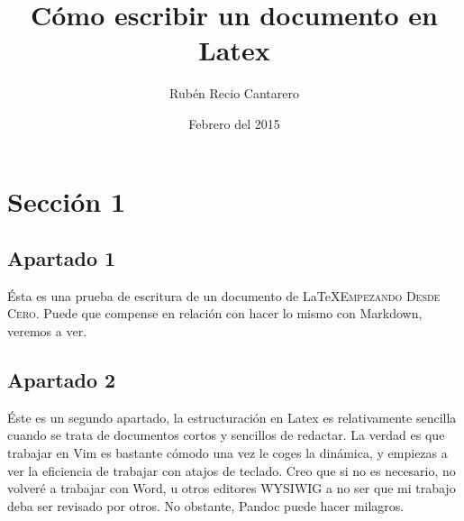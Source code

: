 \documentclass[11pt]{article}
\begin{document}
\title{Cómo escribir un documento en Latex}
\author{Rubén Recio Cantarero}
\date{Febrero del 2015}
\maketitle

\clearpage


\clearpage

\section{Sección 1}
\subsection{Apartado 1}

Ésta es una prueba de escritura de un documento de \LaTeX \textsc{Empezando Desde Cero}. Puede que compense en relación con hacer lo mismo con Markdown, veremos a ver.

\subsection{Apartado 2}
Éste es un segundo apartado, la estructuración en Latex es relativamente sencilla cuando se trata de documentos cortos y sencillos de redactar. La verdad es que trabajar en Vim es bastante cómodo una vez le coges la dinámica, y empiezas a ver la eficiencia de trabajar con atajos de teclado. Creo que si no es necesario, no volveré a trabajar con Word, u otros editores WYSIWIG a no ser que mi trabajo deba ser revisado por otros. No obstante, Pandoc puede hacer milagros.
\end{document}
